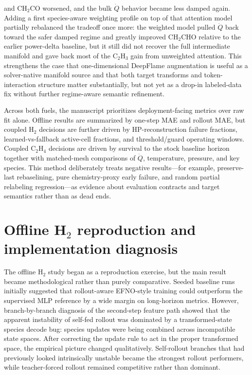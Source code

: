 \documentclass[11pt]{article}
\begin{document}
and CH$_2$CO worsened, and the bulk $\dot{Q}$ behavior became less damped again. Adding a first species-aware weighting profile on top of that attention model partially rebalanced the tradeoff once more: the weighted model pulled $\dot{Q}$ back toward the safer damped regime and greatly improved CH$_2$CHO relative to the earlier power-delta baseline, but it still did not recover the full intermediate manifold and gave back most of the C$_2$H$_3$ gain from unweighted attention. This strengthens the case that one-dimensional DeepFlame augmentation is useful as a solver-native manifold source and that both target transforms and token-interaction structure matter substantially, but not yet as a drop-in labeled-data fix without further regime-aware semantic refinement.

Across both fuels, the manuscript prioritizes deployment-facing metrics over raw fit alone. Offline results are summarized by one-step MAE and rollout MAE, but coupled H$_2$ decisions are further driven by HP-reconstruction failure fractions, learned-vs-fallback active-cell fractions, and threshold/guard operating windows. Coupled C$_2$H$_4$ decisions are driven by survival to the stock baseline horizon together with matched-mesh comparisons of $\dot{Q}$, temperature, pressure, and key species. This method deliberately treats negative results---for example, preserve-last rebaselining, pure chemistry-proxy early failure, and random partial relabeling regression---as evidence about evaluation contracts and target semantics rather than as dead ends.

\section{Offline H$_2$ reproduction and implementation diagnosis}
The offline H$_2$ study began as a reproduction exercise, but the main result became methodological rather than purely comparative. Seeded baseline runs initially suggested that rollout-aware EFNO-style training could outperform the supervised MLP reference by a wide margin on long-horizon metrics. However, branch-by-branch diagnosis of the second-step feature path showed that the apparent instability of self-fed rollout was dominated by a transformed-state species decode bug: species updates were being combined across incompatible state spaces. After correcting the update rule to act in the proper transformed space, the empirical picture changed qualitatively. Self-rollout branches that had previously looked intrinsically unstable became the strongest rollout performers, while teacher-forced rollout remained competitive rather than dominant.
\end{document}
